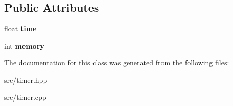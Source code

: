 \subsection*{Public Attributes}
\begin{DoxyCompactItemize}
\item 
\hypertarget{classTimer_a6c45df1d084a18e41e3a35f6a43df0be}{float {\bfseries time}}\label{classTimer_a6c45df1d084a18e41e3a35f6a43df0be}

\item 
\hypertarget{classTimer_adbb859c7553e9986b41fe6ca0dee1913}{int {\bfseries memory}}\label{classTimer_adbb859c7553e9986b41fe6ca0dee1913}

\end{DoxyCompactItemize}


The documentation for this class was generated from the following files\-:\begin{DoxyCompactItemize}
\item 
src/timer.\-hpp\item 
src/timer.\-cpp\end{DoxyCompactItemize}
